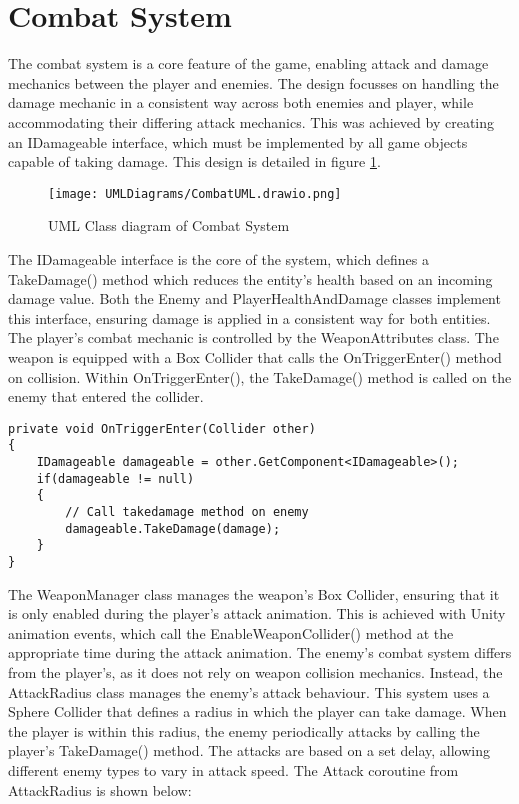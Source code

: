 \documentclass[]{final_report}
\begin{document}
\section{Combat System}\label{combatsystem}
The combat system is a core feature of the game, enabling attack and damage mechanics between the player and enemies. The design focusses on handling the damage mechanic in a consistent way across both enemies and player, while accommodating their differing attack mechanics. This was achieved by creating an IDamageable interface, which must be implemented by all game objects capable of taking damage. This design is detailed in figure  \ref{fig:label_combat}.
\begin{figure}[H]
    \centering
    \texttt{[image: UMLDiagrams/CombatUML.drawio.png]}
    \caption{UML Class diagram of Combat System}
    \label{fig:label_combat}
\end{figure}
The IDamageable interface is the core of the system, which defines a TakeDamage() method which reduces the entity's health based on an incoming damage value. Both the Enemy and PlayerHealthAndDamage classes implement this interface, ensuring damage is applied in a consistent way for both entities. 
\newline The player's combat mechanic is controlled by the WeaponAttributes class. The weapon is equipped with a Box Collider that calls the OnTriggerEnter() method on collision. Within OnTriggerEnter(), the TakeDamage() method is called on the enemy that entered the collider. 
\begin{verbatim}
private void OnTriggerEnter(Collider other)
{
    IDamageable damageable = other.GetComponent<IDamageable>();
    if(damageable != null)
    {
        // Call takedamage method on enemy
        damageable.TakeDamage(damage);
    }
}
\end{verbatim}
The WeaponManager class manages the weapon's Box Collider, ensuring that it is only enabled during the player's attack animation. This is achieved with Unity animation events, which call the EnableWeaponCollider() method at the appropriate time during the attack animation.\newline 
The enemy's combat system differs from the player's, as it does not rely on weapon collision mechanics. Instead, the AttackRadius class manages the enemy's attack behaviour. This system uses a Sphere Collider that defines a radius in which the player can take damage. When the player is within this radius, the enemy periodically attacks by calling the player's TakeDamage() method. The  attacks are based on a set delay, allowing different enemy types to vary in attack speed. The Attack coroutine from AttackRadius is shown below:
\end{document}
